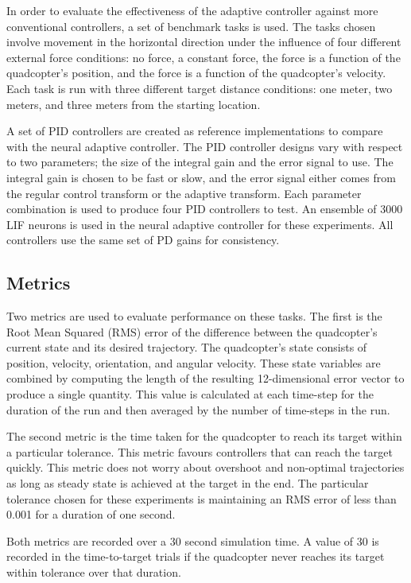 \documentclass[letterpaper, 10 pt, conference]{ieeeconf}  %
\begin{document}
In order to evaluate the effectiveness of the adaptive controller against more conventional controllers, a set of benchmark tasks is used.
The tasks chosen involve movement in the horizontal direction under the influence of four different external force conditions: no force, a constant force, the force is a function of the quadcopter's position, and the force is a function of the quadcopter's velocity.
Each task is run with three different target distance conditions: one meter, two meters, and three meters from the starting location.

A set of PID controllers are created as reference implementations to compare with the neural adaptive controller.
The PID controller designs vary with respect to two parameters; the size of the integral gain and the error signal to use.
The integral gain is chosen to be fast or slow, and the error signal either comes from the regular control transform or the adaptive transform.
Each parameter combination is used to produce four PID controllers to test. 
An ensemble of 3000 LIF neurons is used in the neural adaptive controller for these experiments.
All controllers use the same set of PD gains for consistency.

\subsection{Metrics}

Two metrics are used to evaluate performance on these tasks. 
The first is the Root Mean Squared (RMS) error of the difference between the quadcopter's current state and its desired trajectory.
The quadcopter's state consists of position, velocity, orientation, and angular velocity.
These state variables are combined by computing the length of the resulting 12-dimensional error vector to produce a single quantity.
This value is calculated at each time-step for the duration of the run and then averaged by the number of time-steps in the run.

The second metric is the time taken for the quadcopter to reach its target within a particular tolerance. 
This metric favours controllers that can reach the target quickly.
This metric does not worry about overshoot and non-optimal trajectories as long as steady state is achieved at the target in the end.
The particular tolerance chosen for these experiments is maintaining an RMS error of less than 0.001 for a duration of one second.

Both metrics are recorded over a 30 second simulation time.
A value of 30 is recorded in the time-to-target trials if the quadcopter never reaches its target within tolerance over that duration.
\end{document}
